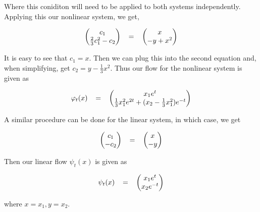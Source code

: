 \begin{solution}
    Where this coniditon will need to be applied to both systems independently. Applying this our nonlinear system, we get,

    \begin{align}
        \begin{pmatrix}c_1\\ \frac{2}{3}c_1^2 - c_2\end{pmatrix} 
        \hspace{3mm} = \hspace{3mm}
        \begin{pmatrix}x \\ -y + x^2\end{pmatrix} \nonumber
    \end{align}

    It is easy to see that $c_1 = x$. Then we can plug this into the second equation and, when simplifying, get $c_2 = y - \frac{1}{3}x^2$. Thus our flow for the nonlinear system is given as 

    \begin{align}
        \varphi_t(x)
        \hspace{3mm} = \hspace{3mm}
        \begin{pmatrix}
            x_1 e^t\\
            \frac{1}{3} x_1^2 e^{2 t} + (x_2 - \frac{1}{3}x_1^2) e^{-t}
        \end{pmatrix}\label{p4: nonlinear flow}
    \end{align}

    A similar procedure can be done for the linear system, in which case, we get

    \begin{align}
        \begin{pmatrix}c_1\\ - c_2\end{pmatrix} 
        \hspace{3mm} = \hspace{3mm}
        \begin{pmatrix}x \\ -y\end{pmatrix} \nonumber
    \end{align}

    Then our linear flow $\psi_t(x)$ is given as 

    \begin{align}
        \psi_t(x)
        \hspace{3mm} = \hspace{3mm}
        \begin{pmatrix}
            x_1 e^t\\
            x_2e^{-t}
        \end{pmatrix}\label{p4: linear flow}
    \end{align}

    where $x = x_1, y = x_2$.
\end{solution}


